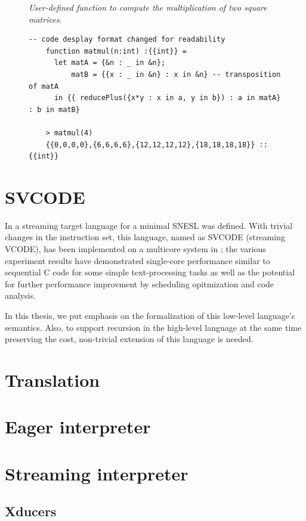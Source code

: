 \begin{figure}[H]
	\begin{example}\emph{User-defined function to compute the multiplication of two square matrices.}
	\end{example}
	\begin{lstlisting}[style = snesl-style]
	-- code desplay format changed for readability
	function matmul(n:int) :{{int}} = 
  	  let matA = {&n : _ in &n};
	      matB = {{x : _ in &n} : x in &n} -- transposition of matA
	  in {{ reducePlus({x*y : x in a, y in b}) : a in matA} : b in matB}
	
	> matmul(4)
	{{0,0,0,0},{6,6,6,6},{12,12,12,12},{18,18,18,18}} :: {{int}}
	\end{lstlisting}
\end{figure}





\section{SVCODE}
In \cite{Fmaster} a streaming target language for a minimal SNESL was defined.
With trivial changes in the instruction set, this language, named as SVCODE (streaming VCODE), has been implemented on a multicore system in \cite{Fphd}; the various experiment results
have demonstrated single-core performance similar to sequential C code for some simple 
text-processing tasks as well as the
potential for further performance improvment by scheduling opitmization and code analysis.

In this thesis, we put emphasis on the formalization of this low-level language's semantics.
Also, to support recursion in the high-level language at the same time preserving the cost, non-trivial extension of this language is needed. 

\section{Translation}

\section{Eager interpreter}
\section{Streaming interpreter}
\subsection{Xducers}


